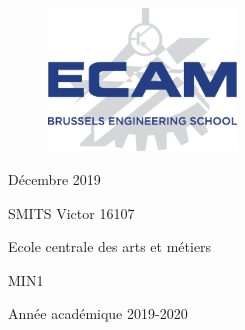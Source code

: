 	\begin{titlepage}
		\begin{center}
			\vspace*{\fill}
			
 			\begin{figure}[h]
       	 		\includegraphics[width=5cm, center]{Figures/Logo_ECAM.jpg}	
       	 	\end{figure}
 			\vspace{\baselineskip}
 			
       		\vspace{0.5cm}


       		\normalsize{Décembre 2019 \\} 
			
       		\vspace*{\fill}
       		
       		\large{SMITS Victor 16107}
            \vspace{\baselineskip}
            
            \large{Ecole centrale des arts et métiers}
            \vspace{\baselineskip}
            
       		\small{MIN1}
       		\vspace{\baselineskip}
       		
       		\normalsize{Année académique 2019-2020}
   		\end{center}
	\end{titlepage}